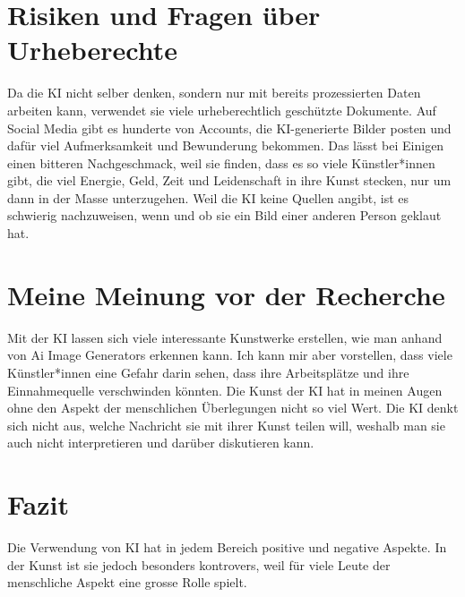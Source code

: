 \documentclass{article}
\begin{document}
\section{Risiken und Fragen über Urheberechte}
    Da die KI nicht selber denken, sondern nur mit bereits prozessierten Daten arbeiten kann, verwendet sie viele urheberechtlich geschützte Dokumente. Auf Social Media gibt es hunderte von Accounts, die KI-generierte Bilder posten und dafür viel Aufmerksamkeit und Bewunderung bekommen. Das lässt bei Einigen einen bitteren Nachgeschmack, weil sie finden, dass es so viele Künstler*innen gibt, die viel Energie, Geld, Zeit und Leidenschaft in ihre Kunst stecken, nur um dann in der Masse unterzugehen. Weil die KI keine Quellen angibt, ist es schwierig nachzuweisen, wenn und ob sie ein Bild einer anderen Person geklaut hat.

\section{Meine Meinung vor der Recherche}
    Mit der KI lassen sich viele interessante Kunstwerke erstellen, wie man anhand von Ai Image 
    Generators erkennen kann. Ich kann mir aber vorstellen, dass viele Künstler*innen eine Gefahr 
    darin sehen, dass ihre Arbeitsplätze und ihre Einnahmequelle verschwinden könnten. Die Kunst der KI 
    hat in meinen Augen ohne den Aspekt der menschlichen Überlegungen nicht so viel Wert. Die KI denkt 
    sich nicht aus, welche Nachricht sie mit ihrer Kunst teilen will, weshalb man sie auch nicht 
    interpretieren und darüber diskutieren kann.

\section{Fazit}
    Die Verwendung von KI hat in jedem Bereich positive und negative Aspekte. In der Kunst ist sie jedoch 
    besonders kontrovers, weil für viele Leute der menschliche Aspekt eine grosse Rolle spielt.



\printbibliography
\end{document}
